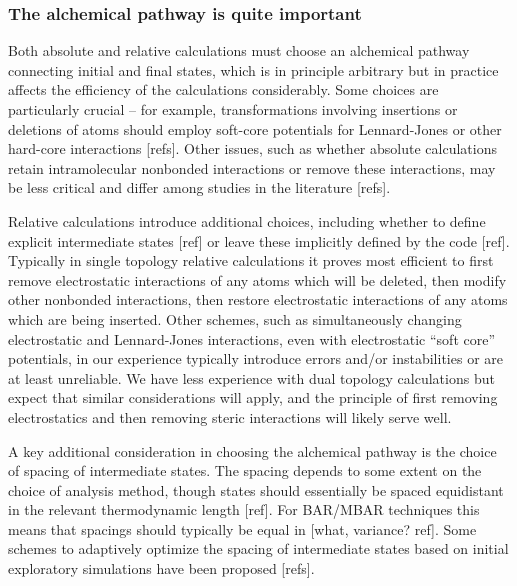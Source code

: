 \documentclass[9pt,bestpractices]{livecoms}
\begin{document}
\subsubsection*{The alchemical pathway is quite important \label{sec:important_path}}


Both absolute and relative calculations must choose an alchemical pathway connecting initial and final states, which is in principle arbitrary but in practice affects the efficiency of the calculations considerably.
Some choices are particularly crucial -- for example, transformations involving insertions or deletions of atoms should employ soft-core potentials for Lennard-Jones or other hard-core interactions [refs].
Other issues, such as whether absolute calculations retain intramolecular nonbonded interactions or remove these interactions, may be less critical and differ among studies in the literature [refs].

Relative calculations introduce additional choices, including whether to define explicit intermediate states [ref] or leave these implicitly defined by the code [ref].
Typically in single topology relative calculations it proves most efficient to first remove electrostatic interactions of any atoms which will be deleted, then modify other nonbonded interactions, then restore electrostatic interactions of any atoms which are being inserted.
Other schemes, such as simultaneously changing electrostatic and Lennard-Jones interactions, even with electrostatic ``soft core'' potentials, in our experience typically introduce errors and/or instabilities or are at least unreliable.
We have less experience with dual topology calculations but expect that similar considerations will apply, and the principle of first removing electrostatics and then removing steric interactions will likely serve well.

A key additional consideration in choosing the alchemical pathway is the choice of spacing of intermediate states.
The spacing depends to some extent on the choice of analysis method, though states should essentially be spaced equidistant in the relevant thermodynamic length [ref].
For BAR/MBAR techniques this means that spacings should typically be equal in [what, variance? ref].
Some schemes to adaptively optimize the spacing of intermediate states based on initial exploratory simulations have been proposed [refs].
\end{document}
